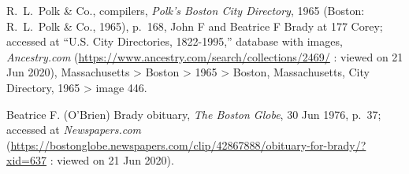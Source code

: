 \begin{thebibliography}{999}
R.\ L.\ Polk \& Co., compilers, \textit{Polk's Boston City Directory}, 1965 (Boston: R.\ L.\ Polk \& Co., 1965), p.\ 168, John F and Beatrice F Brady at 177 Corey; accessed at ``U.S. City Directories, 1822-1995,'' database with images, \textit{Ancestry.com} (\url{https://www.ancestry.com/search/collections/2469/} : viewed on 21 Jun 2020), Massachusetts > Boston > 1965 > Boston, Massachusetts, City Directory, 1965 > image 446.

Beatrice F. (O'Brien) Brady obituary, \textit{The Boston Globe}, 30 Jun 1976, p.\ 37; accessed at \textit{Newspapers.com} (\url{https://bostonglobe.newspapers.com/clip/42867888/obituary-for-brady/?xid=637} : viewed on 21 Jun 2020).
	
\end{thebibliography}